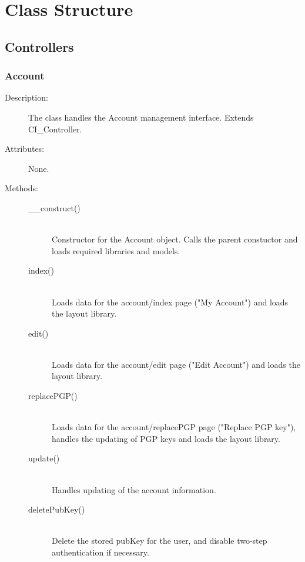 \documentclass[11pt]{article} %
\begin{document}
\newpage

\section{Class Structure}
\subsection{Controllers}
\subsubsection{Account}
\begin{description}
\item[Description:] The class handles the Account management interface. Extends CI\_Controller.
\item[Attributes:] None.
\item[Methods:] \textbf{ }
\begin{description}
\item[\_\_construct()]  \textbf{ }\\
Constructor for the Account object. Calls the parent constuctor and loads required libraries and models.
\item[index()]  \textbf{ }\\
Loads data for the account/index page ("My Account") and loads the layout library.
\item[edit()]  \textbf{ }\\
Loads data for the account/edit page ("Edit Account") and loads the layout library.
\item[replacePGP()]  \textbf{ }\\
Loads data for the account/replacePGP page ("Replace PGP key"), handles the updating of PGP keys and loads the layout library.
\item[update()]  \textbf{ } \\
Handles updating of the account information.
\item[deletePubKey()]  \textbf{ }\\
Delete the stored pubKey for the user, and disable two-step authentication if necessary.
\end{description} 
\end{description} 
\end{document}
